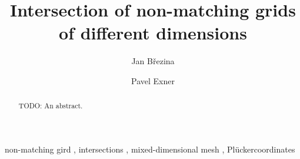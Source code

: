 \documentclass{elsarticle}
\newcommand{\plucker}{Pl\"{u}cker}
\begin{document}
\begin{frontmatter}



\title{Intersection of non-matching grids of different dimensions}


\author[adr]{Jan B{\v r}ezina}

\author[adr]{Pavel Exner}

\address[adr]{Technical University of Liberec, Studentsk{\' a} 1402/2, 461 17 Liberec 1, Czech Republic}


\begin{abstract}
TODO: An abstract.
\end{abstract}

\begin{keyword}
non-matching gird \sep 
intersections \sep
mixed-dimensional mesh \sep
\plucker coordinates




\end{keyword}

\end{frontmatter}
\end{document}
